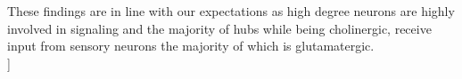\documentclass[10pt,letterpaper]{article}
\newlength\savedwidth
\newcommand\thickhline{\noalign{\global\savedwidth\arrayrulewidth\global\arrayrulewidth 2pt}%
\hline
\noalign{\global\arrayrulewidth\savedwidth}}
\begin{document}
These findings are in line with our expectations as high degree neurons are highly involved in signaling and the majority of hubs while being cholinergic, receive input from sensory neurons the majority of which is glutamatergic. \\
[[NOTE: NOTE HERE ABOUT REDUCED LIST OF GENES IN EACH ANALYSIS (577 and 390 genes for connected and R/F respectively).]]







\end{document}
